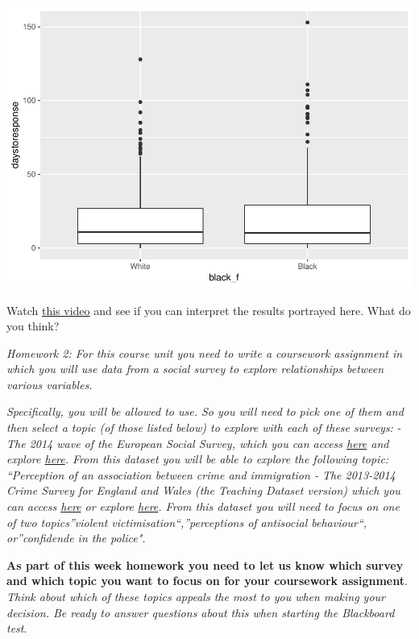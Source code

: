 \documentclass[]{book}
\theoremstyle{definition}
\theoremstyle{definition}
\theoremstyle{definition}
\theoremstyle{remark}
\begin{document}
\includegraphics{02-causality_files/figure-latex/unnamed-chunk-29-1.pdf}

Watch
\href{https://www.khanacademy.org/math/probability/data-distributions-a1/box--whisker-plots-a1/v/reading-box-and-whisker-plots}{this
video} and see if you can interpret the results portrayed here. What do
you think?

\emph{Homework 2: For this course unit you need to write a coursework
assignment in which you will use data from a social survey to explore
relationships between various variables.}

\emph{Specifically, you will be allowed to use. So you will need to pick
one of them and then select a topic (of those listed below) to explore
with each of these surveys:} \emph{- The 2014 wave of the European
Social Survey, which you can access
\href{http://www.europeansocialsurvey.org/data/download.html?r=5}{here}
and explore \href{http://nesstar.ess.nsd.uib.no/webview/}{here}. From
this dataset you will be able to explore the following topic:
``Perception of an association between crime and immigration\emph{ }-
The 2013-2014 Crime Survey for England and Wales (the Teaching Dataset
version) which you can access
\href{https://discover.ukdataservice.ac.uk/catalogue/?sn=7911\&type=Data\%20catalogue}{here}
or explore \href{http://nesstar.ukdataservice.ac.uk/webview/}{here}.
From this dataset you will need to focus on one of two topics''violent
victimisation``,''perceptions of antisocial behaviour``, or''confidende
in the police".}

\textbf{As part of this week homework you need to let us know which
survey and which topic you want to focus on for your coursework
assignment}. \emph{Think about which of these topics appeals the most to
you when making your decision. Be ready to answer questions about this
when starting the Blackboard test}.
\end{document}

